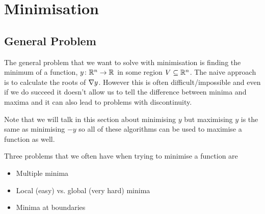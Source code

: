\documentclass[a4paper]{article}
\begin{document}
    \section{Minimisation}
    \subsection{General Problem}
    The general problem that we want to solve with minimisation is finding the minimum of a function, \(y\colon\mathbb{R}^n\to\mathbb{R}\) in some region \(V\subseteq\mathbb{R}^n\).
    The naive approach is to calculate the roots of \(\nabla y\).
    However this is often difficult/impossible and even if we do succeed it doesn't allow us to tell the difference between minima and maxima and it can also lead to problems with discontinuity.
    
    Note that we will talk in this section about minimising \(y\) but maximising \(y \) is the same as minimising \(-y\) so all of these algorithms can be used to maximise a function as well.
    
    Three problems that we often have when trying to minimise a function are
    \begin{itemize}
        \item Multiple minima
        \item Local (easy) vs. global (very hard) minima
        \item Minima at boundaries
    \end{itemize}
    
\end{document}
